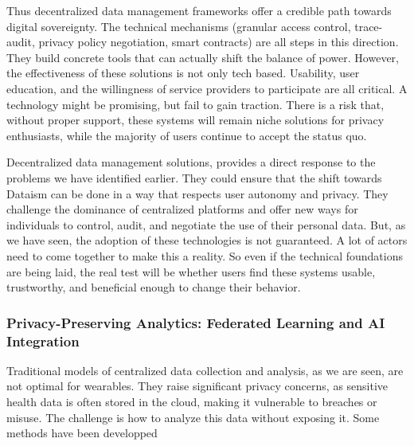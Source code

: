 	Thus decentralized data management frameworks offer a credible path towards digital sovereignty. The technical mechanisms (granular access control, trace-audit, privacy policy negotiation, smart contracts) are all steps in this direction. They build concrete tools that can actually shift the balance of power. However, the effectiveness of these solutions is not only tech based. Usability, user education, and the willingness of service providers to participate are all critical. A technology might be promising, but fail to gain traction. There is a risk that, without proper support, these systems will remain niche solutions for privacy enthusiasts, while the majority of users continue to accept the status quo.

	Decentralized data management solutions, provides a direct response to the problems we have identified earlier. They could ensure that the shift towards Dataism can be done in a way that respects user autonomy and privacy. They challenge the dominance of centralized platforms and offer new ways for individuals to control, audit, and negotiate the use of their personal data. But, as we have seen, the adoption of these technologies is not guaranteed. A lot of actors need to come together to make this a reality. So even if the technical foundations are being laid, the real test will be whether users find these systems usable, trustworthy, and beneficial enough to change their behavior.
	\subsubsection{Privacy-Preserving Analytics: Federated Learning and AI Integration}

	Traditional models of centralized data collection and analysis, as we are seen, are not optimal for wearables. They raise significant privacy concerns, as sensitive health data is often stored in the cloud, making it vulnerable to breaches or misuse. The challenge is how to analyze this data without exposing it. Some methods have been developped 

